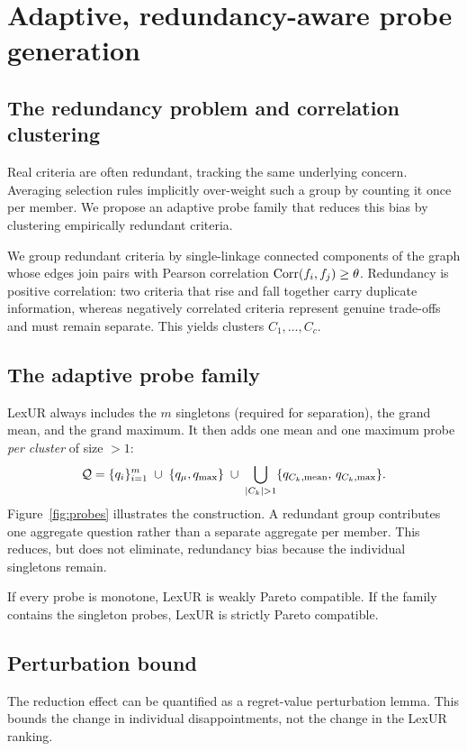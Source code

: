 \section{Adaptive, redundancy-aware probe generation}
\label{sec:probes}

\subsection{The redundancy problem and correlation clustering}
Real criteria are often redundant, tracking the same underlying concern. Averaging selection rules implicitly over-weight such a group by counting it once per member. We propose an adaptive probe family that reduces this bias by clustering empirically redundant criteria. 

We group redundant criteria by single-linkage connected components of the graph whose edges join pairs with Pearson correlation $\operatorname{Corr}(f_i,f_j)\ge\theta$. Redundancy is positive correlation: two criteria that rise and fall together carry duplicate information, whereas negatively correlated criteria represent genuine trade-offs and must remain separate. This yields clusters $C_1,\dots,C_c$.

\subsection{The adaptive probe family}
LexUR always includes the $m$ singletons (required for separation), the grand mean, and the grand maximum. It then adds one mean and one maximum probe \emph{per cluster} of size $>1$:
\begin{equation}
\Q=\{q_i\}_{i=1}^m\;\cup\;\{q_\mu,q_{\max}\}\;\cup\;
\bigcup_{|C_k|>1}\{q_{C_k,\mathrm{mean}},\,q_{C_k,\max}\}.
\end{equation}
Figure~\ref{fig:probes} illustrates the construction. A redundant group contributes one aggregate question rather than a separate aggregate per member. This reduces, but does not eliminate, redundancy bias because the individual singletons remain.



\begin{theorem}
\label{thm:nonneg}
If every probe is monotone, LexUR is weakly Pareto compatible. If the family contains the singleton probes, LexUR is strictly Pareto compatible.
\end{theorem}

\subsection{Perturbation bound}
The reduction effect can be quantified as a regret-value perturbation lemma. This bounds the change in individual disappointments, not the change in the LexUR ranking.

